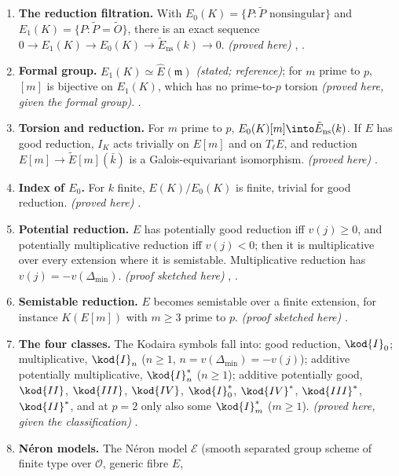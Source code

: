 \begin{enumerate}[label=\textbf{\thechapter.\arabic*}]
nonsplit, and over the unramified quadratic extension the reduction is split. \emph{(proved here)} .
\item \textbf{The reduction filtration.} With $E_0(K)=\{P:\tilde P\text{ nonsingular}\}$ and $E_1(K)=\{P:\tilde P=\tilde O\}$, there is an exact
sequence $0\to E_1(K)\to E_0(K)\to\tilde E_{\mathrm{ns}}(k)\to0$. \emph{(proved here)} ,
.
\item \textbf{Formal group.} $E_1(K)\simeq\hat E(\mathfrak m)$ \emph{(stated; reference)}; for $m$ prime to $p$, $[m]$ is bijective on $E_1(K)$,
which has no prime-to-$p$ torsion \emph{(proved here, given the formal group)}. .
\item \textbf{Torsion and reduction.} For $m$ prime to $p$, $E_0(K)[m]\into\tilde E_{\mathrm{ns}}(k)$. If $E$ has good reduction, $I_K$ acts
trivially on $E[m]$ and on $T_\ell E$, and reduction $E[m]\to\tilde E[m](\bar k)$ is a Galois-equivariant isomorphism. \emph{(proved here)}
.
\item \textbf{Index of $E_0$.} For $k$ finite, $E(K)/E_0(K)$ is finite, trivial for good reduction. \emph{(proved here)}
.
\item \textbf{Potential reduction.} $E$ has potentially good reduction iff $v(j)\ge0$, and potentially multiplicative reduction iff $v(j)<0$;
then it is multiplicative over every extension where it is semistable. Multiplicative reduction has $v(j)=-v(\Delta_{\min})$.
\emph{(proof sketched here)} , .
\item \textbf{Semistable reduction.} $E$ becomes semistable over a finite extension, for instance $K(E[m])$ with $m\ge3$ prime to $p$.
\emph{(proof sketched here)} .
\item \textbf{The four classes.} The Kodaira symbols fall into: good reduction, $\kod{I}_0$; multiplicative, $\kod{I}_n$ ($n\ge1$,
$n=v(\Delta_{\min})=-v(j)$); additive potentially multiplicative, $\kod{I}_n^*$ ($n\ge1$); additive potentially good, $\kod{II}$, $\kod{III}$,
$\kod{IV}$, $\kod{I}_0^*$, $\kod{IV}^*$, $\kod{III}^*$, $\kod{II}^*$, and at $p=2$ only also some $\kod{I}_m^*$ ($m\ge1$). \emph{(proved here, given the
classification)} .
\item \textbf{N\'eron models.} The N\'eron model $\mathcal E$ (smooth separated group scheme of finite type over $\mathcal O$, generic fibre $E$,

\end{enumerate}
